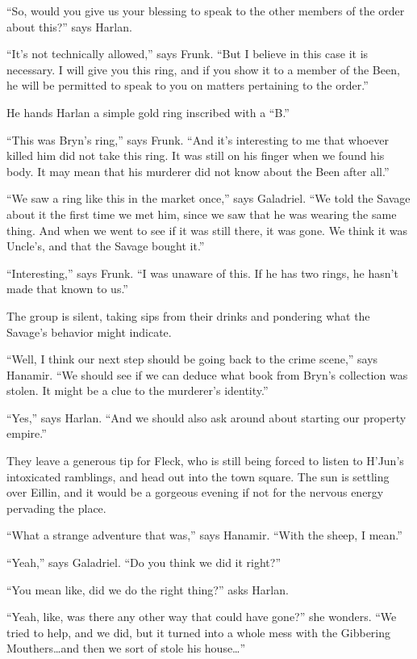 \documentclass[smalldemyvopaper,11pt,twoside,onecolumn,openright,extrafontsizes]{memoir}
\begin{document}
``So, would you give us your blessing to speak to the other members of
the order about this?'' says Harlan.

``It's not technically allowed,'' says Frunk. ``But I believe in this
case it is necessary. I will give you this ring, and if you show it to a
member of the Been, he will be permitted to speak to you on matters
pertaining to the order.''

He hands Harlan a simple gold ring inscribed with a ``B.''

``This was Bryn's ring,'' says Frunk. ``And it's interesting to me that
whoever killed him did not take this ring. It was still on his finger
when we found his body. It may mean that his murderer did not know about
the Been after all.''

``We saw a ring like this in the market once,'' says Galadriel. ``We
told the Savage about it the first time we met him, since we saw that he
was wearing the same thing. And when we went to see if it was still
there, it was gone. We think it was Uncle's, and that the Savage bought
it.''

``Interesting,'' says Frunk. ``I was unaware of this. If he has two
rings, he hasn't made that known to us.''

The group is silent, taking sips from their drinks and pondering what
the Savage's behavior might indicate.

``Well, I think our next step should be going back to the crime scene,''
says Hanamir. ``We should see if we can deduce what book from Bryn's
collection was stolen. It might be a clue to the murderer's identity.''

``Yes,'' says Harlan. ``And we should also ask around about starting our
property empire.''

They leave a generous tip for Fleck, who is still being forced to listen
to H'Jun's intoxicated ramblings, and head out into the town square. The
sun is settling over Eillin, and it would be a gorgeous evening if not
for the nervous energy pervading the place.

``What a strange adventure that was,'' says Hanamir. ``With the sheep, I
mean.''

``Yeah,'' says Galadriel. ``Do you think we did it right?''

``You mean like, did we do the right thing?'' asks Harlan.

``Yeah, like, was there any other way that could have gone?'' she
wonders. ``We tried to help, and we did, but it turned into a whole mess
with the Gibbering Mouthers\ldots and then we sort of stole his
house\ldots{}''
\end{document}
